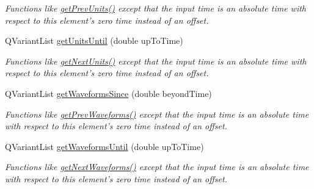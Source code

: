 \begin{DoxyCompactItemize}
\begin{DoxyCompactList}\small\item\em Functions like \hyperlink{class_picto_1_1_analysis_spike_data_af11c5f4e5b0ffdcc587650d2fa01103e}{get\-Prev\-Units()} except that the input time is an absolute time with respect to this element's zero time instead of an offset. \end{DoxyCompactList}\item 
\hypertarget{class_picto_1_1_analysis_spike_data_a23f53970177742c4abd00b06282c8e5b}{Q\-Variant\-List \hyperlink{class_picto_1_1_analysis_spike_data_a23f53970177742c4abd00b06282c8e5b}{get\-Units\-Until} (double up\-To\-Time)}\label{class_picto_1_1_analysis_spike_data_a23f53970177742c4abd00b06282c8e5b}

\begin{DoxyCompactList}\small\item\em Functions like \hyperlink{class_picto_1_1_analysis_spike_data_af7bcca3f9facb8503d690bf58abf8653}{get\-Next\-Units()} except that the input time is an absolute time with respect to this element's zero time instead of an offset. \end{DoxyCompactList}\item 
\hypertarget{class_picto_1_1_analysis_spike_data_aedf78399fd61df9b4501f20fa2fb2cdd}{Q\-Variant\-List \hyperlink{class_picto_1_1_analysis_spike_data_aedf78399fd61df9b4501f20fa2fb2cdd}{get\-Waveforms\-Since} (double beyond\-Time)}\label{class_picto_1_1_analysis_spike_data_aedf78399fd61df9b4501f20fa2fb2cdd}

\begin{DoxyCompactList}\small\item\em Functions like \hyperlink{class_picto_1_1_analysis_spike_data_afd0f2d38028b3f6fef76e2d6eae6f2d6}{get\-Prev\-Waveforms()} except that the input time is an absolute time with respect to this element's zero time instead of an offset. \end{DoxyCompactList}\item 
\hypertarget{class_picto_1_1_analysis_spike_data_acaccb63e4d8e1a3aec4ded7f4d3fd5a6}{Q\-Variant\-List \hyperlink{class_picto_1_1_analysis_spike_data_acaccb63e4d8e1a3aec4ded7f4d3fd5a6}{get\-Waveforms\-Until} (double up\-To\-Time)}\label{class_picto_1_1_analysis_spike_data_acaccb63e4d8e1a3aec4ded7f4d3fd5a6}

\begin{DoxyCompactList}\small\item\em Functions like \hyperlink{class_picto_1_1_analysis_spike_data_a40d43d9fb67ac53fe348ac695688bc05}{get\-Next\-Waveforms()} except that the input time is an absolute time with respect to this element's zero time instead of an offset. \end{DoxyCompactList}\end{DoxyCompactItemize}
